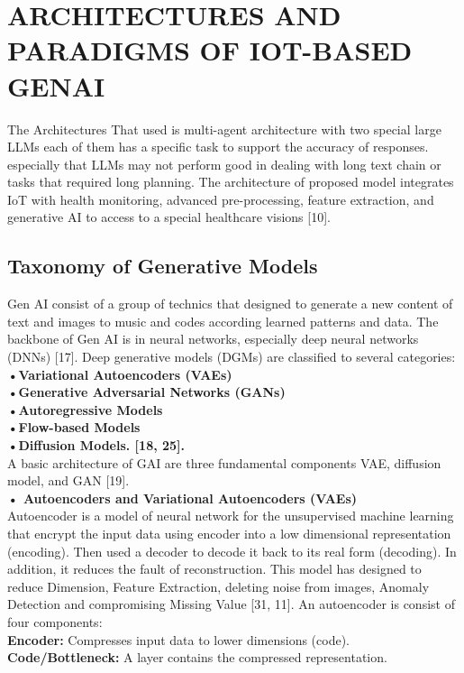 \documentclass[journal]{IEEEtran}
\begin{document}
\section{ARCHITECTURES AND PARADIGMS OF IOT-BASED GENAI}
The Architectures That used is multi-agent architecture with two special large LLMs each of them has a specific task to support the accuracy of responses. especially that LLMs may not perform good in dealing with long text chain or tasks that required long planning. The architecture of proposed model integrates IoT with health monitoring, advanced pre-processing, feature extraction, and generative AI to access to a special healthcare visions [10].
\subsection{Taxonomy of Generative Models}
Gen AI consist of a group of technics that designed to generate a new content of text and images to music and codes according learned patterns and data. The backbone of Gen AI is in neural networks, especially deep neural networks (DNNs) [17]. Deep generative models (DGMs) are classified to several categories:\\
\textbf{•Variational Autoencoders (VAEs)}\\
\textbf{•Generative Adversarial Networks (GANs)}\\
\textbf{•Autoregressive Models}\\
\textbf{•Flow-based Models}\\
\textbf{•Diffusion Models. [18, 25].}\\
A basic architecture of GAI are three fundamental components VAE, diffusion model, and GAN [19].\\
\textbf{•	Autoencoders and Variational Autoencoders (VAEs)}\\
Autoencoder is a model of neural network for the unsupervised machine learning that encrypt the input data using encoder into a low dimensional representation (encoding). Then used a decoder to decode it back to its real form (decoding). In addition, it reduces the fault of reconstruction. This model has designed to reduce Dimension, Feature Extraction, deleting noise from images, Anomaly Detection and compromising Missing Value [31, 11]. An autoencoder is consist of four components:\\
\textbf{Encoder:} Compresses input data to lower dimensions (code).\\
\textbf{Code/Bottleneck:} A layer contains the compressed representation.\\
\end{document}
